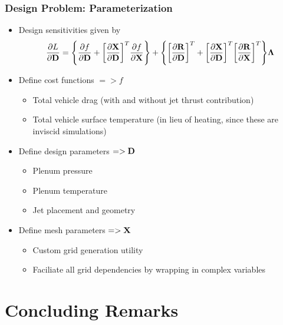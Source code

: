 \documentclass{beamer}
\begin{document}
\begin{frame}
  \frametitle{Design Problem: Parameterization}
  \begin{itemize}
    \item Design sensitivities given by
      \[
        \frac{\partial L}{\partial \mathbf D} =
        \Bigg\{\frac{\partial f}{\partial \mathbf D} + \bigg[\frac{\partial \mathbf X}{\partial \mathbf D}\bigg]^T
        \frac{\partial f}{\partial \mathbf X}\Bigg\} + \Bigg\{\bigg[\frac{\partial \mathbf R}{\partial \mathbf D}\bigg]^T
        + \bigg[\frac{\partial \mathbf X}{\partial \mathbf D}\bigg]^T\bigg[ \frac{\partial \mathbf R}{\partial \mathbf X}\bigg]^T\Bigg\}\mathbf \Lambda
      \]
    \item Define cost functions $=> f$
      \begin{itemize}
        \item Total vehicle drag (with and without jet thrust contribution)
        \item Total vehicle surface temperature (in lieu of heating, since
          these are inviscid simulations)
      \end{itemize}
    \item Define design parameters $=> \mathbf D$
      \begin{itemize}
        \item Plenum pressure
        \item Plenum temperature
        \item Jet placement and geometry
      \end{itemize}
    \item Define mesh parameters $=> \mathbf X$
      \begin{itemize}
        \item Custom grid generation utility
        \item Faciliate all grid dependencies by wrapping in complex variables
      \end{itemize}

  \end{itemize}
\end{frame}

\section{Concluding Remarks}
\end{document}

